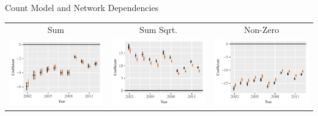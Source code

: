 \documentclass{beamer}
\begin{document}
\begin{frame}{Count Model and Network Dependencies}

\centering
\begin{tabular}{c@{\hskip -.4cm}c@{\hskip -.4cm}c}
\small{Sum} & \small{Sum Sqrt.}  & \small{Non-Zero}  \\
\includegraphics[height=.3\textheight, clip=true, trim=.5cm .5cm 0cm .1cm]{slides_figures/rl_plots/Sum.pdf}    &
\includegraphics[height=.3\textheight, clip=true, trim=.5cm .5cm 0cm .1cm]{slides_figures/rl_plots/Sum_5.pdf}   &
\includegraphics[height=.3\textheight, clip=true, trim=.5cm .5cm 0cm .1cm]{slides_figures/rl_plots/Nonzero.pdf}\\



\end{tabular}
\end{frame}
\end{document}
